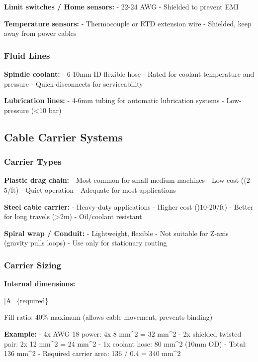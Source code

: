 \documentclass[
]{article}
\begin{document}
\textbf{Limit switches / Home sensors:} - 22-24 AWG - Shielded to
prevent EMI

\textbf{Temperature sensors:} - Thermocouple or RTD extension wire -
Shielded, keep away from power cables

\subsubsection{Fluid Lines}\label{fluid-lines}

\textbf{Spindle coolant:} - 6-10mm ID flexible hose - Rated for coolant
temperature and pressure - Quick-disconnects for serviceability

\textbf{Lubrication lines:} - 4-6mm tubing for automatic lubrication
systems - Low-pressure (\textless10 bar)

\subsection{Cable Carrier Systems}\label{cable-carrier-systems}

\subsubsection{Carrier Types}\label{carrier-types}

\textbf{Plastic drag chain:} - Most common for small-medium machines -
Low cost ((2-5/ft) - Quiet operation - Adequate for most applications

\textbf{Steel cable carrier:} - Heavy-duty applications - Higher cost
()10-20/ft) - Better for long travels (\textgreater2m) - Oil/coolant
resistant

\textbf{Spiral wrap / Conduit:} - Lightweight, flexible - Not suitable
for Z-axis (gravity pulls loops) - Use only for stationary routing

\subsubsection{Carrier Sizing}\label{carrier-sizing}

\textbf{Internal dimensions:}

{[}A\_\{required\} = \frac{\sum A_{cables}}{0.4}{]}

Fill ratio: 40\% maximum (allows cable movement, prevents binding)

\textbf{Example:} - 4x AWG 18 power: 4x 8 mm\^{}2 = 32 mm\^{}2 - 2x
shielded twisted pair: 2x 12 mm\^{}2 = 24 mm\^{}2 - 1x coolant hose: 80
mm\^{}2 (10mm OD) - Total: 136 mm\^{}2 - Required carrier area: 136 /
0.4 = 340 mm\^{}2
\end{document}
